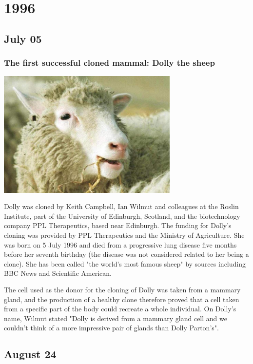 \documentclass[11pt]{report}
\begin{document}
\chapter{1996}
\section{July 05}
\subsection{The first successful cloned mammal: Dolly the sheep}
\vspace{2mm}\begin{center}\includegraphics[width=9cm]{./img/dollySheep.jpg}\end{center}
Dolly was cloned by Keith Campbell, Ian Wilmut and colleagues at the Roslin Institute, part of the University of Edinburgh, Scotland, and the biotechnology company PPL Therapeutics, based near Edinburgh. The funding for Dolly's cloning was provided by PPL Therapeutics and the Ministry of Agriculture. She was born on 5 July 1996 and died from a progressive lung disease five months before her seventh birthday (the disease was not considered related to her being a clone). She has been called "the world's most famous sheep" by sources including BBC News and Scientific American.

The cell used as the donor for the cloning of Dolly was taken from a mammary gland, and the production of a healthy clone therefore proved that a cell taken from a specific part of the body could recreate a whole individual. On Dolly's name, Wilmut stated "Dolly is derived from a mammary gland cell and we couldn't think of a more impressive pair of glands than Dolly Parton's".

\section{August 24}
\end{document}
